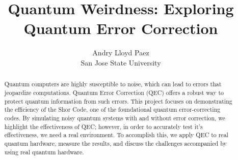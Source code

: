 \documentclass[10pt]{article}
\title{Quantum Weirdness: Exploring Quantum Error Correction}
\author{Andry Lloyd Paez \\
San Jose State University}
\date{}
\begin{document}
\maketitle

\begin{abstract}
Quantum computers are highly susceptible to noise, which can lead to errors that jeopardize computations. Quantum Error Correction (QEC) offers a robust way to protect quantum information from such errors. This project focuses on demonstrating the efficiency of the Shor Code, one of the foundational quantum error-correcting codes. By simulating noisy quantum systems with and without error correction, we highlight the effectiveness of QEC; however, in order to accurately test it's effectiveness, we need a real environment. To accomplish this, we apply QEC to real quantum hardware, measure the results, and discuss the challenges accompanied by using real quantum hardware.
\end{abstract}
\end{document}
